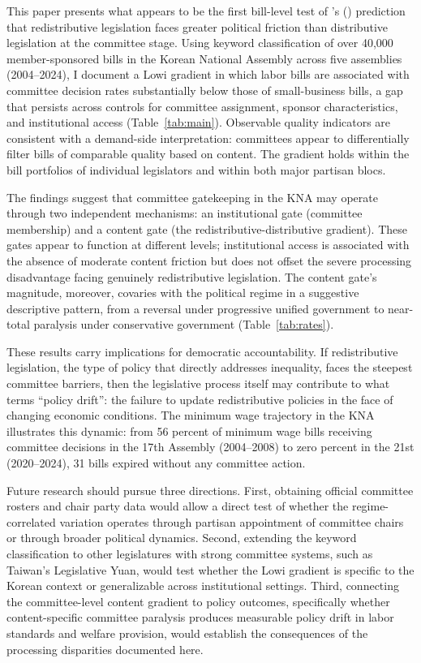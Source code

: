 \documentclass[11pt]{article}
\begin{document}
This paper presents what appears to be the first bill-level test of \citeauthor{lowi1964}'s (\citeyear{lowi1964}) prediction that redistributive legislation faces greater political friction than distributive legislation at the committee stage. Using keyword classification of over 40,000 member-sponsored bills in the Korean National Assembly across five assemblies (2004--2024), I document a Lowi gradient in which labor bills are associated with committee decision rates substantially below those of small-business bills, a gap that persists across controls for committee assignment, sponsor characteristics, and institutional access (Table~\ref{tab:main}). Observable quality indicators are consistent with a demand-side interpretation: committees appear to differentially filter bills of comparable quality based on content. The gradient holds within the bill portfolios of individual legislators and within both major partisan blocs.

The findings suggest that committee gatekeeping in the KNA may operate through two independent mechanisms: an institutional gate (committee membership) and a content gate (the redistributive-distributive gradient). These gates appear to function at different levels; institutional access is associated with the absence of moderate content friction but does not offset the severe processing disadvantage facing genuinely redistributive legislation. The content gate's magnitude, moreover, covaries with the political regime in a suggestive descriptive pattern, from a reversal under progressive unified government to near-total paralysis under conservative government (Table~\ref{tab:rates}).

These results carry implications for democratic accountability. If redistributive legislation, the type of policy that directly addresses inequality, faces the steepest committee barriers, then the legislative process itself may contribute to what \citet{hacker2004} terms ``policy drift'': the failure to update redistributive policies in the face of changing economic conditions. The minimum wage trajectory in the KNA illustrates this dynamic: from 56 percent of minimum wage bills receiving committee decisions in the 17th Assembly (2004--2008) to zero percent in the 21st (2020--2024), 31 bills expired without any committee action.

Future research should pursue three directions. First, obtaining official committee rosters and chair party data would allow a direct test of whether the regime-correlated variation operates through partisan appointment of committee chairs or through broader political dynamics. Second, extending the keyword classification to other legislatures with strong committee systems, such as Taiwan's Legislative Yuan, would test whether the Lowi gradient is specific to the Korean context or generalizable across institutional settings. Third, connecting the committee-level content gradient to policy outcomes, specifically whether content-specific committee paralysis produces measurable policy drift in labor standards and welfare provision, would establish the consequences of the processing disparities documented here.
\end{document}
